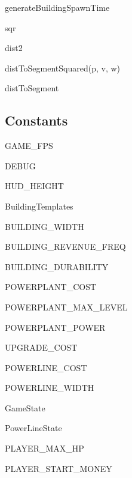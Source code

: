 	generateBuildingSpawnTime

	sqr

	dist2

	distToSegmentSquared(p, v, w)

	distToSegment


\subsection*{Constants}
	
	GAME\_FPS

	DEBUG

	HUD\_HEIGHT

	BuildingTemplates

	BUILDING\_WIDTH

	BUILDING\_REVENUE\_FREQ

	BUILDING\_DURABILITY

	POWERPLANT\_COST

	POWERPLANT\_MAX\_LEVEL

	POWERPLANT\_POWER

	UPGRADE\_COST

	POWERLINE\_COST

	POWERLINE\_WIDTH

	GameState

	PowerLineState

	PLAYER\_MAX\_HP

	PLAYER\_START\_MONEY
